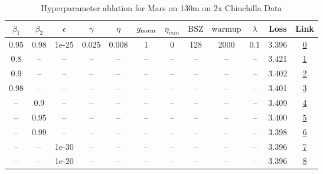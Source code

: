 \begin{table}[H]
\centering
\caption{Hyperparameter ablation for Mars on 130m on 2x Chinchilla Data}
\label{tab:ablation_mars_130m_on_2x_chinchilla_data}
\begin{tabular}{cccccccccccc}
\toprule
$\beta_1$ & $\beta_2$ & $\epsilon$ & $\gamma$ & $\eta$ & $g_{\mathrm{norm}}$ & $\eta_{min}$ & $\mathrm{BSZ}$ & $\mathrm{warmup}$ & $\lambda$ & Loss & Link \\
\midrule
0.95 & 0.98 & 1e-25 & 0.025 & 0.008 & 1 & 0 & 128 & 2000 & 0.1 & 3.396 & \href{https://wandb.ai/marin-community/optimizer-scaling/runs/sweep-130m-5B-marsc95aa3lr0.008-wd0.1-minlr0-warmup2000-b10.95-b-7a23c5}{0} \\
\midrule
0.8 & -- & -- & -- & -- & -- & -- & -- & -- & -- & 3.421 & \href{https://wandb.ai/marin-community/optimizer-scaling/runs/sweep-130m-5B-marscd02f0lr0.008-wd0.1-minlr0-warmup2000-b10.8-b2-4592bf}{1} \\
0.9 & -- & -- & -- & -- & -- & -- & -- & -- & -- & 3.402 & \href{https://wandb.ai/marin-community/optimizer-scaling/runs/sweep-130m-5B-marspfd075dlr0.008-wd0.1-minlr0-warmup2000-b10.9-b-b40465}{2} \\
0.98 & -- & -- & -- & -- & -- & -- & -- & -- & -- & 3.401 & \href{https://wandb.ai/marin-community/optimizer-scaling/runs/sweep-130m-5B-marsc8034dlr0.008-wd0.1-minlr0-warmup2000-b10.98-b-a89aca}{3} \\
-- & 0.9 & -- & -- & -- & -- & -- & -- & -- & -- & 3.409 & \href{https://wandb.ai/marin-community/optimizer-scaling/runs/sweep-130m-5B-mars58007elr0.008-wd0.1-minlr0-warmup2000-b10.95-b-a6ce83}{4} \\
-- & 0.95 & -- & -- & -- & -- & -- & -- & -- & -- & 3.400 & \href{https://wandb.ai/marin-community/optimizer-scaling/runs/sweep-130m-5B-marspa9b599lr0.008-wd0.1-minlr0-warmup2000-b10.95--0ab9b0}{5} \\
-- & 0.99 & -- & -- & -- & -- & -- & -- & -- & -- & 3.398 & \href{https://wandb.ai/marin-community/optimizer-scaling/runs/sweep-130m-5B-mars104ea4lr0.008-wd0.1-minlr0-warmup2000-b10.95-b-ce96d6}{6} \\
-- & -- & 1e-30 & -- & -- & -- & -- & -- & -- & -- & 3.396 & \href{https://wandb.ai/marin-community/optimizer-scaling/runs/sweep-130m-5B-marsc95aa3lr0.008-wd0.1-minlr0-warmup2000-b10.95-b-7a23c5}{7} \\
-- & -- & 1e-20 & -- & -- & -- & -- & -- & -- & -- & 3.396 & \href{https://wandb.ai/marin-community/optimizer-scaling/runs/sweep-130m-5B-marsfe50f8lr0.008-wd0.1-minlr0-warmup2000-b10.95-b-93f048}{8} \\

\end{tabular}
\end{table}
